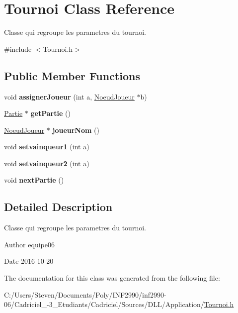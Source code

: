 \hypertarget{class_tournoi}{}\section{Tournoi Class Reference}
\label{class_tournoi}


Classe qui regroupe les parametres du tournoi.  




{\ttfamily \#include $<$Tournoi.\+h$>$}

\subsection*{Public Member Functions}
\begin{DoxyCompactItemize}
\item 
\hypertarget{class_tournoi_aef3539df119116b9bd69feff6c1e0c80}{}\label{class_tournoi_aef3539df119116b9bd69feff6c1e0c80} 
void {\bfseries assigner\+Joueur} (int a, \hyperlink{class_noeud_joueur}{Noeud\+Joueur} $\ast$b)
\item 
\hypertarget{class_tournoi_a565249eb997c83e8d34ddacd1880c40f}{}\label{class_tournoi_a565249eb997c83e8d34ddacd1880c40f} 
\hyperlink{class_partie}{Partie} $\ast$ {\bfseries get\+Partie} ()
\item 
\hypertarget{class_tournoi_aaa193cf85c395c4f0d5afac3b0ee2f98}{}\label{class_tournoi_aaa193cf85c395c4f0d5afac3b0ee2f98} 
\hyperlink{class_noeud_joueur}{Noeud\+Joueur} $\ast$ {\bfseries joueur\+Nom} ()
\item 
\hypertarget{class_tournoi_aae35120bbe6d6ffc186e7223c642dacc}{}\label{class_tournoi_aae35120bbe6d6ffc186e7223c642dacc} 
void {\bfseries setvainqueur1} (int a)
\item 
\hypertarget{class_tournoi_a69f37f76eefbfdead4ebbc38eb496ef0}{}\label{class_tournoi_a69f37f76eefbfdead4ebbc38eb496ef0} 
void {\bfseries setvainqueur2} (int a)
\item 
\hypertarget{class_tournoi_a25c9d2157e95ab68b2abf07c15e00f09}{}\label{class_tournoi_a25c9d2157e95ab68b2abf07c15e00f09} 
void {\bfseries next\+Partie} ()
\end{DoxyCompactItemize}


\subsection{Detailed Description}
Classe qui regroupe les parametres du tournoi. 

\begin{DoxyAuthor}{Author}
equipe06 
\end{DoxyAuthor}
\begin{DoxyDate}{Date}
2016-\/10-\/20 
\end{DoxyDate}


The documentation for this class was generated from the following file\+:\begin{DoxyCompactItemize}
\item 
C\+:/\+Users/\+Steven/\+Documents/\+Poly/\+I\+N\+F2990/inf2990-\/06/\+Cadriciel\+\_-\/3\+\_\+\+Etudiants/\+Cadriciel/\+Sources/\+D\+L\+L/\+Application/\hyperlink{_tournoi_8h}{Tournoi.\+h}\end{DoxyCompactItemize}
